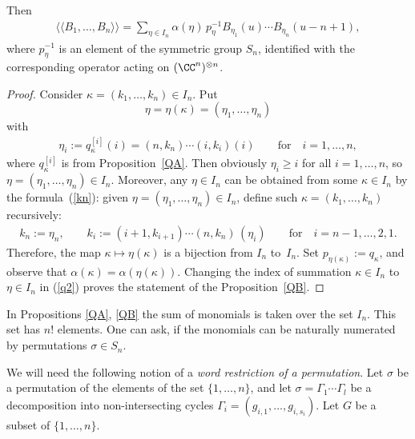 \begin{proposition}\label{QB}
 Then
\begin{gather*}%
\langle \langle B_1,\dots, B_n\rangle \rangle
=\sum_{ \eta\in I_n }\alpha{( \eta)}\,p_\eta^{-1}B_{ \eta_1}(u)\cdots B_{ \eta_n}(u-n+1),
\end{gather*}
where $p_\eta^{-1}$   is an  element of the symmetric group $S_n$, identified with the corresponding operator acting on $(\CC^n)^{\otimes n}$.
 \end{proposition}

\begin{proof}
Consider $\kappa=(k_1, \dots, k_n)\in I_n$.  Put
\[
\eta=\eta(\kappa)=(\eta_1, \dots, \eta_n)
\] with
\begin{gather}\label{kn}
\eta_i:=q_{\kappa}^{[i]}(i)=(n,k_n)\cdots (i, k_i) (i)  \qquad\text{for}\quad  i=1,\dots, n,
\end{gather}
where $q_{\kappa}^{[i]}$ is from Proposition~\ref{QA}.
Then obviously $\eta_i\!\ge\! i$ for all $i=1, \dots, n$, so \mbox{$\eta\!=\!(\eta_1, \dots, \eta_n)\!\in\! I_n$}. Moreover, any $\eta\in I_n$ can be obtained from some $\kappa \in I_n$ by the formula~(\ref{kn}): given $\eta=(\eta_1, \dots, \eta_n)\in I_n$, def\/ine  such $\kappa=(k_1, \dots, k_n)$ recursively:
\begin{gather*}
k_n:= \eta_n,\qquad
k_i:= (i+1,k_{i+1})\cdots (n, k_n)\,(\eta_i)\qquad \text{for}\quad i=n-1,\dots, 2,1.
\end{gather*}
Therefore, the map $\kappa\mapsto \eta(\kappa)$ is a bijection from $I_n$ to~$I_n$. Set $p_{\eta(\kappa)}:=q_\kappa$, and  observe that $\alpha(\kappa)= \alpha (\eta(\kappa))$. Changing the index of summation $\kappa \in I_n$ to  $\eta \in I_n$ in  (\ref{q2}) proves the statement  of the Proposition~\ref{QB}.
\end{proof}

In Propositions \ref{QA},  \ref{QB} the sum of monomials  is taken over the set $I_n$. This set   has  $n!$ elements. One can ask, if the monomials can be  naturally numerated by permutations  $\sigma\in S_n$.

We will need the following notion of a {\it word restriction of a permutation}.
 Let $\sigma$  be a permutation of the elements of the set $\{1, \dots, n\}$, and let $\sigma=\Gamma_1\cdots \Gamma_l$ be a decomposition  into non-intersecting cycles $\Gamma_i=(g_{i,1},\dots, g_{i,s_i})$.  Let $G$ be a subset of $\{1, \dots, n\}$.

